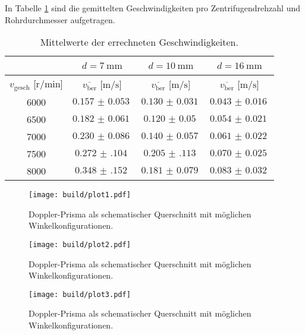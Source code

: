 In Tabelle \ref{tab:7} sind die gemittelten Geschwindigkeiten pro Zentrifugendrehzahl und Rohrdurchmesser aufgetragen.

 \begin{table}
     \centering
     \caption{Mittelwerte der errechneten Geschwindigkeiten.}
     \label{tab:7}
     \begin{tabular}{c || c | c | c}
         \multicolumn{1}{c}{~} & \multicolumn{1}{c}{$d = \SI{7}{\milli\meter}$} & \multicolumn{1}{c}{$d = \SI{10}{\milli\meter}$} & \multicolumn{1}{c}{$d = \SI{16}{\milli\meter}$}\\
         \toprule
         $v_{\text{gesch}}$ [$\si{{\text{r}}\per\minute}$]  & $\overline{v_{\text{ber}}}$ [$\si{\meter\per\second}$] &  $\overline{v_{\text{ber}}}$ [$\si{\meter\per\second}$] & $\overline{v_{\text{ber}}}$ [$\si{\meter\per\second}$] \\
         \midrule
         6000    &  $\SI{0.157(53)}{}$    & $\SI{0.130(31)}{}$   & $\SI{0.043(16)}{}$   \\ 
         6500    &  $\SI{0.182(61)}{}$    & $\SI{0.120(50)}{}$   & $\SI{0.054(21)}{}$   \\ 
         7000    &  $\SI{0.230(86)}{}$    & $\SI{0.140(57)}{}$   & $\SI{0.061(22)}{}$   \\ 
         7500    &  $\SI{0.272(104)}{}$   & $\SI{0.205(113)}{}$  & $\SI{0.070(25)}{}$  \\ 
         8000    &  $\SI{0.348(152)}{}$   & $\SI{0.181(79)}{}$   & $\SI{0.083(32)}{}$   \\  
         \bottomrule
     \end{tabular}
 \end{table}

\begin{figure}
    \centering
    \texttt{[image: build/plot1.pdf]}
    \caption{Doppler-Prisma als schematischer Querschnitt mit möglichen Winkelkonfigurationen. \cite{skript}} 
    \label{fig:figskizze1}
\end{figure}
\begin{figure}
    \centering
    \texttt{[image: build/plot2.pdf]}
    \caption{Doppler-Prisma als schematischer Querschnitt mit möglichen Winkelkonfigurationen. \cite{skript}} 
    \label{fig:figskizze1}
\end{figure}
\begin{figure}
    \centering
    \texttt{[image: build/plot3.pdf]}
    \caption{Doppler-Prisma als schematischer Querschnitt mit möglichen Winkelkonfigurationen. \cite{skript}} 
    \label{fig:figskizze1}
\end{figure}
